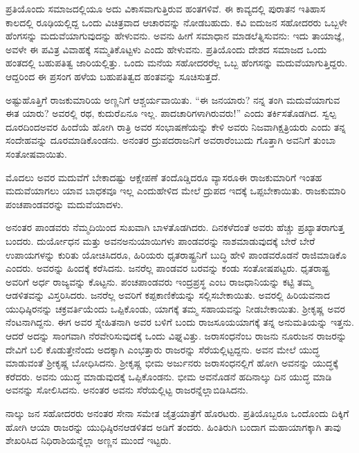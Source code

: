 ಪ್ರತಿಯೊಂದು ಸಮಾಜದಲ್ಲಿಯೂ ಅದು ವಿಕಾಸವಾಗುತ್ತಿರುವ ಹಂತಗಳಿವೆ. ಈ ಕಾವ್ಯದಲ್ಲಿ ಪುರಾತನ ಇತಿಹಾಸ ಕಾಲದಲ್ಲಿ ರೂಢಿಯಲ್ಲಿದ್ದ ಒಂದು ವಿಚಿತ್ರವಾದ ಆಚಾರವನ್ನು ನೋಡಬಹುದು. ಕವಿ ಐದುಜನ ಸಹೋದರರು ಒಬ್ಬಳೇ ಹೆಂಗಸನ್ನು ಮದುವೆಯಾಗುವುದನ್ನು ಹೇಳುವನು. ಅವನು ಹೀಗೆ ಸಮಾಧಾನ ಮಾಡಲೆತ್ನಿಸುವನು: ಇದು ತಾಯಾಜ್ಞೆ, ಅವಳೇ ಈ ಪವಿತ್ರ ವಿವಾಹಕ್ಕೆ ಸಮ್ಮತಿಕೊಟ್ಟಳು ಎಂದು ಹೇಳುವನು. ಪ್ರತಿಯೊಂದು ದೇಶದ ಸಮಾಜದ ಒಂದು ಹಂತದಲ್ಲಿ ಬಹುಪತಿತ್ವ ಜಾರಿಯಲ್ಲಿತ್ತು. ಒಂದು ಮನೆಯ ಸಹೋದರರೆಲ್ಲ ಒಬ್ಬ ಹೆಂಗಸನ್ನು ಮದುವೆಯಾಗುತ್ತಿದ್ದರು. ಆದ್ದರಿಂದ ಈ ಪ್ರಸಂಗ ಹಳೆಯ ಬಹುಪತಿತ್ವದ ಹಂತವನ್ನು ಸೂಚಿಸುತ್ತದೆ.

ಅಷ್ಟುಹೊತ್ತಿಗೆ ರಾಜಕುಮಾರಿಯ ಅಣ್ಣನಿಗೆ ಆಶ್ಚರ್ಯವಾಯಿತು. “ಈ ಜನ\break ಯಾರು? ನನ್ನ ತಂಗಿ ಮದುವೆಯಾಗುವ ಈತ ಯಾರು? ಅವರಲ್ಲಿ ರಥ, ಕುದುರೆ\break ಏನೂ ಇಲ್ಲ. ಪಾದಚಾರಿಗಳಾಗಿರುವರು!” ಎಂದು ತರ್ಕಿಸತೊಡಗಿದ. ಸ್ವಲ್ಪ ದೂರದಿಂದ\break ಅವರ ಹಿಂದೆಯೆ ಹೋಗಿ ರಾತ್ರಿ ಅವರ ಸಂಭಾಷಣೆಯನ್ನು ಕೇಳಿ ಅವರು ನಿಜವಾಗಿ\break ಕ್ಷತ್ರಿಯರು ಎಂದು ತನ್ನ ಸಂದೇಹವನ್ನು ದೂರಮಾಡಿಕೊಂಡನು. ಅನಂತರ ದ್ರುಪದ\-ರಾಜನಿಗೆ ಅವರಾರೆಂಬುದು ಗೊತ್ತಾಗಿ ಅವನಿಗೆ ತುಂಬಾ ಸಂತೋಷವಾಯಿತು.

ಮೊದಲು ಅವರ ಮದುವೆಗೆ ಬೇಕಾದಷ್ಟು ಆಕ್ಷೇಪಣೆ ತಂದೊಡ್ಡಿದರೂ ವ್ಯಾಸರೂ\break ಈ ರಾಜಕುಮಾರಿಗೆ ಇಂತಹ ಮದುವೆಯಾಗಲು ಯಾವ ಬಾಧಕವೂ ಇಲ್ಲ ಎಂದು\break ಹೇಳಿದ ಮೇಲೆ ದ್ರುಪದ ಇದಕ್ಕೆ ಒಪ್ಪಬೇಕಾಯಿತು. ರಾಜಕುಮಾರಿ ಪಂಚಪಾಂಡವರನ್ನು ಮದುವೆಯಾದಳು.

ಅನಂತರ ಪಾಂಡವರು ನೆಮ್ಮದಿಯಿಂದ ಸುಖವಾಗಿ ಬಾಳತೊಡಗಿದರು. ದಿನಕಳೆದಂತೆ ಅವರು ಹೆಚ್ಚು ಪ್ರಖ್ಯಾತರಾಗುತ್ತ ಬಂದರು. ದುರ್ಯೋಧನ ಮತ್ತು ಅವನ\break ಅನುಯಾಯಿಗಳು ಪಾಂಡವರನ್ನು ನಾಶಮಾಡುವುದಕ್ಕೆ ಬೇರೆ ಬೇರೆ ಉಪಾಯಗಳನ್ನು ಕುರಿತು ಯೋಚಿಸಿದರೂ, ಹಿರಿಯರು ಧೃತರಾಷ್ಟ್ರನಿಗೆ ಬುದ್ಧಿ ಹೇಳಿ ಪಾಂಡವರೊಡನೆ ರಾಜಿಮಾಡಿಕೊ ಎಂದರು. ಅವರನ್ನು ಹಿಂದಕ್ಕೆ ಕರೆಸಿದನು. ಜನರೆಲ್ಲ ಪಾಂಡವರ ಬರವನ್ನು ಕಂಡು ಸಂತೋಷಪಟ್ಟರು. ಧೃತರಾಷ್ಟ್ರ ಅವರಿಗೆ ಅರ್ಧ ರಾಜ್ಯವನ್ನು ಕೊಟ್ಟನು. ಪಂಚಪಾಂಡವರು ಇಂದ್ರಪ್ರಸ್ಥ ಎಂಬ ರಾಜಧಾನಿಯನ್ನು ಕಟ್ಟಿ ತಮ್ಮ ಆಡಳಿತವನ್ನು ವಿಸ್ತರಿಸಿದರು. ಜನರೆಲ್ಲ ಅವರಿಗೆ ಕಪ್ಪಕಾಣಿಕೆಯನ್ನು ಸಲ್ಲಿಸಬೇಕಾಯಿತು. ಅವರಲ್ಲಿ ಹಿರಿಯವನಾದ ಯುಧಿಷ್ಠಿರನನ್ನು ಚಕ್ರವರ್ತಿಯೆಂದು ಒಪ್ಪಿಕೊಂಡು, ಯಾಗಕ್ಕೆ ತಮ್ಮ ಸಹಾಯವನ್ನು ನೀಡಬೇಕಾಯಿತು. ಶ‍್ರೀಕೃಷ್ಣ ಅವರ ನೆಂಟನಾಗಿದ್ದನು. ಈಗ ಅವರ ಸ್ನೇಹಿತನಾಗಿ ಅವರ ಬಳಿಗೆ ಬಂದು ರಾಜಸೂಯಯಾಗಕ್ಕೆ ತನ್ನ ಅನುಮತಿಯನ್ನು ಇತ್ತನು. ಆದರೆ ಅದನ್ನು ಸಾಂಗವಾಗಿ ನೆರವೇರಿಸುವುದಕ್ಕೆ ಒಂದು ವಿಘ್ನವಿತ್ತು. ಜರಾಸಂಧನೆಂಬ ರಾಜನು ನೂರುಜನ ರಾಜರನ್ನು ದೇವಿಗೆ ಬಲಿ ಕೊಡುತ್ತೇನೆಂದು ಅದಕ್ಕಾಗಿ ಎಂಭತ್ತಾರು ರಾಜರನ್ನು ಸೆರೆಯಲ್ಲಿಟ್ಟದ್ದನು. ಅವನ ಮೇಲೆ ಯುದ್ಧ ಮಾಡುವಂತೆ ಶ‍್ರೀಕೃಷ್ಣ ಬೋಧಿಸಿದನು. ಶ‍್ರೀಕೃಷ್ಣ ಭೀಮ ಅರ್ಜುನರು ಜರಾಸಂಧನಲ್ಲಿಗೆ ಹೋಗಿ ಅವನನ್ನು ಯುದ್ಧಕ್ಕೆ ಕರೆದರು. ಅವನು ಯುದ್ಧ ಮಾಡುವುದಕ್ಕೆ ಒಪ್ಪಿಕೊಂಡನು. ಭೀಮ ಅವನೊಡನೆ ಹದಿನಾಲ್ಕು ದಿನ ಯುದ್ಧ ಮಾಡಿ ಅವನನ್ನು ಸೋಲಿಸಿದನು. ಅನಂತರ ಅವನು ಸೆರೆಯಲ್ಲಿಟ್ಟ ರಾಜರನ್ನೆಲ್ಲಾ\break ಬಿಡಿಸಿದನು.

ನಾಲ್ಕು ಜನ ಸಹೋದರರು ಅನಂತರ ಸೇನಾ ಸಮೇತ ಜೈತ್ರಯಾತ್ರೆಗೆ ಹೊರಟರು. ಪ್ರತಿಯೊಬ್ಬರೂ ಒಂದೊಂದು ದಿಕ್ಕಿಗೆ ಹೋಗಿ ಆಯಾ ರಾಜರನ್ನು ಯುಧಿಷ್ಠಿರನ\break ಆಡಳಿತದ ಅಡಿಗೆ ತಂದರು. ಹಿಂತಿರುಗಿ ಬಂದಾಗ ಮಹಾಯಾಗಕ್ಕಾಗಿ ತಾವು ಶೇಖರಿಸಿದ ನಿಧಿರಾಶಿಯನ್ನೆಲ್ಲಾ ಅಣ್ಣನ ಮುಂದೆ ಇಟ್ಟರು.

\vskip 0.1cm

